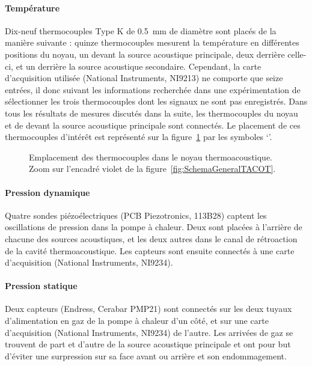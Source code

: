 \paragraph*{Température} Dix-neuf thermocouples Type K de \qty{.5}{\milli\meter} de diamètre sont placés de la manière suivante : quinze thermocouples mesurent la température en différentes positions du noyau, un devant la source acoustique principale, deux derrière celle-ci, et un derrière la source acoustique secondaire. Cependant, la carte d'acquisition utilisée (National Instruments, NI9213) ne comporte que seize entrées, il  donc suivant les informations recherchée dans une expérimentation de sélectionner les trois thermocouples dont les signaux ne sont pas enregistrés. Dans tous les résultats de mesures discutés dans la suite, les thermocouples du noyau et de devant la source acoustique principale sont connectés. Le placement de ces thermocouples d'intérêt est représenté sur la figure~\ref{fig:TCdansNoyau} par les symboles `\textcolor{cyan}{\textbullet}'.

\begin{figure}[!ht]
    \centering
    
    \caption{Emplacement des thermocouples dans le noyau thermoacoustique. Zoom sur l'encadré violet de la figure~\ref{fig:SchemaGeneralTACOT}.}
    \label{fig:TCdansNoyau}
\end{figure}

\paragraph*{Pression dynamique} Quatre sondes piézoélectriques (PCB Piezotronics, 113B28) captent les oscillations de pression dans la pompe à chaleur. Deux sont placées à l'arrière de chacune des sources acoustiques, et les deux autres dans le canal de rétroaction de la cavité thermoacoustique. Les capteurs sont ensuite connectés à une carte d'acquisition (National Instruments, NI9234). 

\paragraph*{Pression statique} Deux capteurs (Endress, Cerabar PMP21) sont connectés sur les deux tuyaux d'alimentation en gaz de la pompe  à chaleur d'un côté, et sur une carte d'acquisition (National Instruments, NI9234) de l'autre. Les arrivées de gaz se trouvent de part et d'autre de la source acoustique principale et ont pour but d'éviter une surpression sur sa face avant ou arrière et son endommagement.


